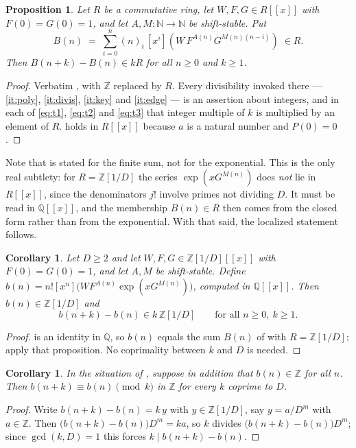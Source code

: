 \documentclass[11pt,a4paper]{article}
\theoremstyle{plain}
\newtheorem{proposition}[theorem]{Proposition}
\newtheorem{corollary}[theorem]{Corollary}
\theoremstyle{definition}
\newcommand{\N}{\mathbb{N}}
\newcommand{\Z}{\mathbb{Z}}
\newcommand{\Q}{\mathbb{Q}}
\newcommand{\ff}[2]{(#1)_{#2}}
\newcommand{\coeff}[1]{[x^{#1}]}
\begin{document}
\begin{proposition}\label{prop:ring}
Let $R$ be a commutative ring, let $W,F,G\in R[[x]]$ with $F(0)=G(0)=1$, and let
$A,M\colon\N\to\N$ be shift-stable. Put
\[
  B(n)\;=\;\sum_{i=0}^{n}\ff{n}{i}\,\coeff{i}\!\left(W\,F^{A(n)}G^{M(n)(n-i)}\right)\;\in R .
\]
Then $B(n+k)-B(n)\in kR$ for all $n\ge0$ and $k\ge1$.
\end{proposition}

\begin{proof}
Verbatim , with $\Z$ replaced by $R$. Every divisibility invoked there ---
\ref{it:poly}, \ref{it:divis}, \ref{it:key} and \ref{it:edge} --- is an
assertion about integers, and in each of \eqref{eq:t1}, \eqref{eq:t2} and \eqref{eq:t3}
that integer multiple of $k$ is multiplied by an element of $R$.  holds
in $R[[x]]$ because $a$ is a natural number and $P(0)=0$.
\end{proof}

Note that  is stated for the finite sum, not for the exponential. This is
the only real subtlety: for $R=\Z[1/D]$ the series $\exp(xG^{M(n)})$ does \emph{not} lie in
$R[[x]]$, since the denominators $j!$ involve primes not dividing $D$. It must be read in
$\Q[[x]]$, and the membership $B(n)\in R$ then comes from the closed form rather than from
the exponential. With that said, the localized statement follows.

\begin{corollary}\label{cor:localized}
Let $D\ge2$ and let $W,F,G\in\Z[1/D][[x]]$ with $F(0)=G(0)=1$, and let $A,M$ be
shift-stable. Define $b(n)=n!\coeff{n}\big(WF^{A(n)}\exp(xG^{M(n)})\big)$, computed in
$\Q[[x]]$. Then $b(n)\in\Z[1/D]$ and
\[
  b(n+k)-b(n)\in k\,\Z[1/D]\qquad\text{for all }n\ge0,\ k\ge1 .
\]
\end{corollary}

\begin{proof}
 is an identity in $\Q$, so $b(n)$ equals the sum $B(n)$ of
 with $R=\Z[1/D]$; apply that proposition. No coprimality between $k$ and
$D$ is needed.
\end{proof}

\begin{corollary}\label{cor:descent}
In the situation of , suppose in addition that $b(n)\in\Z$ for all $n$.
Then $b(n+k)\equiv b(n)\pmod k$ in $\Z$ for every $k$ coprime to $D$.
\end{corollary}

\begin{proof}
Write $b(n+k)-b(n)=k\,y$ with $y\in\Z[1/D]$, say $y=a/D^{m}$ with $a\in\Z$. Then
$\big(b(n+k)-b(n)\big)D^{m}=ka$, so $k$ divides $\big(b(n+k)-b(n)\big)D^{m}$; since
$\gcd(k,D)=1$ this forces $k\mid b(n+k)-b(n)$.
\end{proof}
\end{document}
